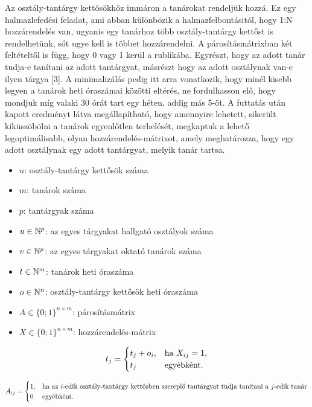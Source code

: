 

Az osztály-tantárgy kettősökhöz immáron a tanárokat rendeljük hozzá. Ez egy halmazlefedési feladat, ami abban különbözik a halmazfelbontásitól, hogy 1:N hozzárendelés van, ugyanis egy tanárhoz több osztály-tantárgy kettőst is rendelhetünk, sőt ugye kell is többet hozzárendelni. A párosításmátrixban két feltételtől is függ, hogy 0 vagy 1 kerül a rublikába. Egyrészt, hogy az adott tanár tudja-e tanítani az adott tantárgyat, másrészt hogy az adott osztálynak van-e ilyen tárgya [3]. A minimalizálás pedig itt arra vonatkozik, hogy minél kisebb legyen a tanárok heti óraszámai közötti eltérés, ne fordulhasson elő, hogy mondjuk míg valaki 30 órát tart egy héten, addig más 5-öt.
A futtatás után kapott eredményt látva megállapítható, hogy amennyire lehetett, sikerült kiküszöbölni a tanárok egyenlőtlen terhelését, megkaptuk a lehető legoptimálisabb, olyan hozzárendelés-mátrixot, amely meghatározza, hogy egy adott osztálynak egy adott tantárgyat, melyik tanár tartsa.


\begin{itemize}
	\item $n$: osztály-tantárgy kettősök száma
	\item $m$: tanárok száma
	\item $p$: tantárgyak száma
	\item $u \in \Bbb{N}^p$: az egyes tárgyakat hallgató osztályok száma
	\item $v \in \Bbb{N}^p$: az egyes tárgyakat oktató tanárok száma
	\item $t \in \Bbb{N}^m$: tanárok heti óraszáma
	\item $o \in \Bbb{N}^n$: osztály-tantárgy kettősök heti óraszáma
	\item $A \in \{0;1\}^{n \times m}$: párosításmátrix
	\item $X \in \{0;1\}^{n \times m}$: hozzárendelés-mátrix
\end{itemize}

\[
t_{j} =
\begin{cases}
t_j+o_i,& \hbox{ha } X_{ij}=1, \\
t_j & \hbox{egyébként}.
\end{cases}
\]

\[
A_{ij} =
\begin{cases}
1, & \hbox{ha az $i$-edik osztály-tantárgy kettősben szereplő tantárgyat tudja tanítani a $j$-edik tanár} \\
0 & \hbox{egyébként}.
\end{cases}
\]

